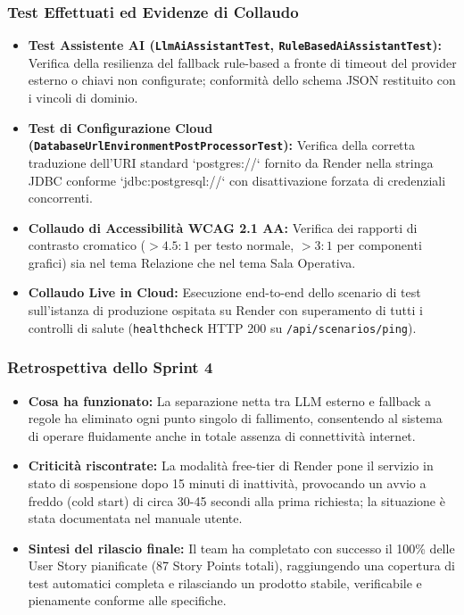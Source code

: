 \subsubsection{Test Effettuati ed Evidenze di Collaudo}
\begin{itemize}[leftmargin=1.4em, itemsep=0.2em]
    \item \textbf{Test Assistente AI (\texttt{LlmAiAssistantTest}, \texttt{RuleBasedAiAssistantTest}):} Verifica della resilienza del fallback rule-based a fronte di timeout del provider esterno o chiavi non configurate; conformità dello schema JSON restituito con i vincoli di dominio.
    \item \textbf{Test di Configurazione Cloud (\texttt{DatabaseUrlEnvironmentPostProcessorTest}):} Verifica della corretta traduzione dell'URI standard `postgres://` fornito da Render nella stringa JDBC conforme `jdbc:postgresql://` con disattivazione forzata di credenziali concorrenti.
    \item \textbf{Collaudo di Accessibilità WCAG 2.1 AA:} Verifica dei rapporti di contrasto cromatico ($> 4.5:1$ per testo normale, $> 3:1$ per componenti grafici) sia nel tema Relazione che nel tema Sala Operativa.
    \item \textbf{Collaudo Live in Cloud:} Esecuzione end-to-end dello scenario di test sull'istanza di produzione ospitata su Render con superamento di tutti i controlli di salute (\texttt{healthcheck} HTTP 200 su \texttt{/api/scenarios/ping}).
\end{itemize}

\subsubsection{Retrospettiva dello Sprint 4}
\begin{itemize}[leftmargin=1.4em, itemsep=0.2em]
    \item \textbf{Cosa ha funzionato:} La separazione netta tra LLM esterno e fallback a regole ha eliminato ogni punto singolo di fallimento, consentendo al sistema di operare fluidamente anche in totale assenza di connettività internet.
    \item \textbf{Criticità riscontrate:} La modalità free-tier di Render pone il servizio in stato di sospensione dopo 15 minuti di inattività, provocando un avvio a freddo (cold start) di circa 30-45 secondi alla prima richiesta; la situazione è stata documentata nel manuale utente.
    \item \textbf{Sintesi del rilascio finale:} Il team ha completato con successo il 100\% delle User Story pianificate (87 Story Points totali), raggiungendo una copertura di test automatici completa e rilasciando un prodotto stabile, verificabile e pienamente conforme alle specifiche.
\end{itemize}
